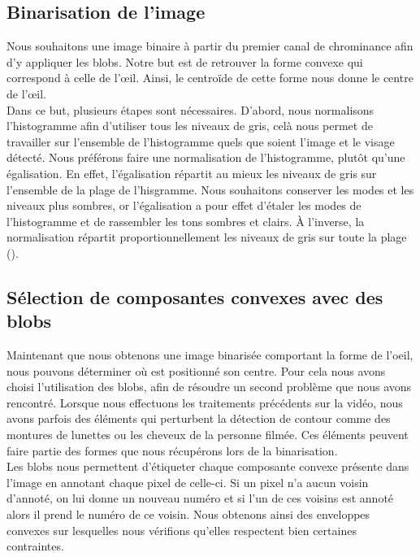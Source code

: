 \subsection{Binarisation de l'image}
Nous souhaitons une image binaire à partir du premier canal de chrominance afin d'y appliquer les blobs. 
Notre but est de retrouver la forme convexe qui correspond à celle de l'œil. Ainsi, le centroïde de cette 
forme nous donne le centre de l'œil.\\

Dans ce but, plusieurs étapes sont nécessaires. D'abord, nous normalisons l'histogramme afin d'utiliser 
tous les niveaux de gris, celà nous permet de travailler sur l'ensemble de l'histogramme quels que soient
l'image et le visage détecté. Nous préférons faire une normalisation de l'histogramme, plutôt qu'une 
égalisation. En effet, l'égalisation répartit au mieux les niveaux de gris sur l'ensemble de 
la plage de l'hisgramme. Nous souhaitons conserver les modes et les niveaux plus sombres, or l'égalisation 
a pour effet d'étaler les modes de l'histogramme et de rassembler les tons sombres et clairs. À l'inverse, 
la normalisation répartit proportionnellement les niveaux de gris sur toute la plage ().\\


\subsection{Sélection de composantes convexes avec des blobs}
Maintenant que nous obtenons une image binarisée comportant la forme de l'oeil, nous pouvons déterminer où est
positionné son centre. Pour cela nous avons choisi l'utilisation des blobs, afin de résoudre un second 
problème que nous avons rencontré. Lorsque nous effectuons les traitements précédents sur la vidéo, nous avons
parfois des éléments qui perturbent la détection de contour comme des montures de lunettes ou les cheveux de la personne 
filmée. Ces éléments peuvent faire partie des formes que nous récupérons lors de la binarisation.\\ 

Les blobs nous permettent d'étiqueter chaque composante convexe présente dans l'image en annotant
chaque pixel de celle-ci. Si un pixel n'a aucun voisin d'annoté, on lui donne un nouveau numéro et si
l'un de ces voisins est annoté alors il prend le numéro de ce voisin. Nous obtenons ainsi des enveloppes
convexes sur lesquelles nous vérifions qu'elles respectent bien certaines contraintes.\\

